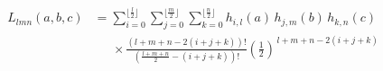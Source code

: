 \begin{align}
L_{lmn}(a,b,c) &= 
\sum_{i=0}^{\lfloor\frac{l}{2}\rfloor}
\sum_{j=0}^{\lfloor\frac{m}{2}\rfloor}
\sum_{k=0}^{\lfloor\frac{n}{2}\rfloor}
h_{i,l}(a)\, h_{j,m}(b)\, h_{k,n}(c) \\
&\quad\;\, \times 
\frac{(l+m+n-2(i+j+k))!}
     { \left( \frac{l+m+n}{2} - (i+j+k) \right)! }
\left( \frac{1}{2} \right)^{\,l+m+n-2(i+j+k)}
\end{align}
